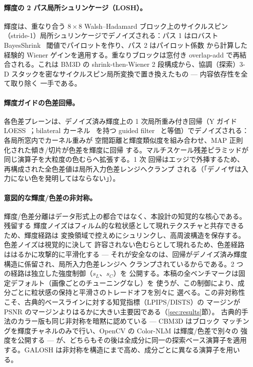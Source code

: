 \documentclass[10pt,twocolumn]{article}
\begin{document}
\paragraph{輝度の 2 パス局所シュリンケージ（LOSH）。}
輝度は、重なり合う $8{\times}8$ Walsh--Hadamard ブロック上のサイクルスピン
（stride-1）局所シュリンケージでデノイズされる：パス 1 はロバスト
BayesShrink~\cite{bayesshrink} 閾値でパイロットを作り、パス 2 はパイロット係数
から計算した経験的 Wiener ゲインを適用する。重なりブロックは窓付き overlap-add
で再結合される。これは BM3D の shrink-then-Wiener 2 段構成から、協調（探索）3-D
スタックを密なサイクルスピン局所変換で置き換えたもの --- 内容依存性を全て取り除く
一手である。

\paragraph{輝度ガイドの色差回帰。}
各色差プレーンは、デノイズ済み輝度上の 1 次局所重み付き回帰（Y ガイド
LOESS~\cite{loess}；bilateral カーネル~\cite{kopf} を持つ guided
filter~\cite{guidedfilter} と等価）でデノイズされる：各局所窓内でカーネル重みが
空間距離と輝度類似度を組み合わせ、MAP 正則化された傾き/切片が色差を輝度に回帰
する。マルチスケール残差ピラミッドが同じ演算子を大粒度の色むらへ拡張する。1 次
回帰はエッジで外挿するため、再構成された全色差値は局所入力色差レンジへクランプ
される（「デノイザは入力にない色を発明してはならない」）。

\paragraph{意図的な輝度/色差の非対称。}
輝度/色差分離はデータ形式上の都合ではなく、本設計の知覚的な核心である。残留する
輝度ノイズはフィルム的な粒状感として現れテクスチャと共存できるため、輝度経路は
変換領域で控えめにシュリンクし、高周波構造を保存する。色差ノイズは視覚的に決して
許容されない色むらとして現れるため、色差経路ははるかに攻撃的に平滑化する ---
それが安全なのは、回帰がデノイズ済み輝度構造に係留され、局所入力色差レンジへ
クランプされているからである。2 つの経路は独立した強度制御（$s_L$、$s_C$）を
公開する。本稿の全ベンチマークは固定デフォルト（画像ごとのチューニングなし）を
使うが、この制御により、成分ごとに粒状感の保持と平滑さのトレードオフを別々に
選べる。この非対称性こそ、古典的ベースラインに対する知覚指標（LPIPS/DISTS）の
マージンが PSNR のマージンよりはるかに大きい主要因である（\ref{sec:results}節）。
古典的手法のカラー版も同じ非対称を暗黙に認めている --- CBM3D はブロック
マッチングを輝度チャネルのみで行い、OpenCV の Color-NLM は輝度/色差で別々の
強度を公開する --- が、どちらもその後は全成分に同一の探索ベース演算子を適用
する。GALOSH は非対称を構造にまで高め、成分ごとに異なる演算子を用いる。
\end{document}

